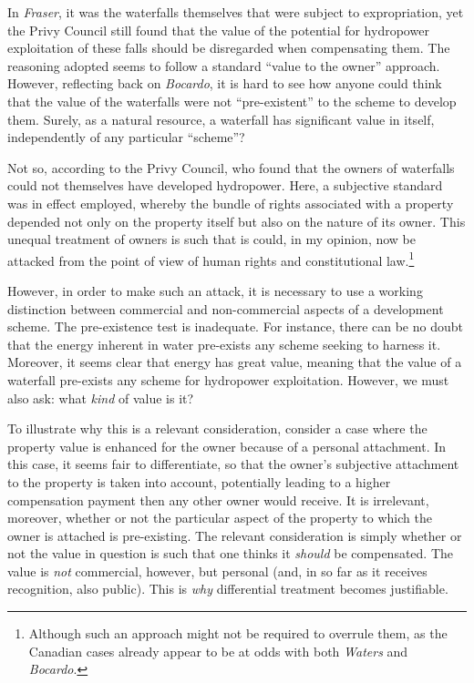 In \emph{Fraser}, it was the waterfalls themselves that were subject to expropriation, yet the Privy Council still found that the value of the potential for hydropower exploitation of these falls should be disregarded when compensating them. The reasoning adopted seems to follow a standard ``value to the owner'' approach. However, reflecting back on {\it Bocardo}, it is hard to see how anyone could think that the value of the waterfalls were not ``pre-existent'' to the scheme to develop them. Surely, as a natural resource, a waterfall has significant value in itself, independently of any particular ``scheme''? 

Not so, according to the Privy Council, who found that the owners of waterfalls could not themselves have developed hydropower. Here, a subjective standard was in effect employed, whereby the bundle of rights associated with a property depended not only on the property itself but also on the nature of its owner. This unequal treatment of owners is such that is could, in my opinion, now be attacked from the point of view of human rights and constitutional law.\footnote{Although such an approach might not be required to overrule them, as the Canadian cases already appear to be at odds with both {\it Waters} and {\it Bocardo}.}

However, in order to make such an attack, it is necessary to use a working distinction between commercial and non-commercial aspects of a development scheme. The pre-existence test is inadequate. For instance, there can be no doubt that the energy inherent in water pre-exists any scheme seeking to harness it. Moreover, it seems clear that energy has great value, meaning that the value of a waterfall pre-exists any scheme for hydropower exploitation. However, we must also ask: what \emph{kind} of value is it?

To illustrate why this is a relevant consideration, consider a case where the property value is enhanced for the owner because of a personal attachment. In this case, it seems fair to differentiate, so that the owner's subjective attachment to the property is taken into account, potentially leading to a higher compensation payment then any other owner would receive. It is irrelevant, moreover, whether or not the particular aspect of the property to which the owner is attached is pre-existing. The relevant consideration is simply whether or not the value in question is such that one thinks it {\it should} be compensated. The value is {\it not} commercial, however, but personal (and, in so far as it receives recognition, also public). This is {\it why} differential treatment becomes justifiable. 

